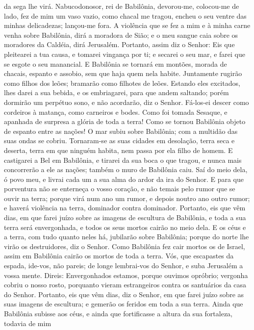 da sega lhe virá. Nabucodonosor, rei de Babilônia,
devorou-me, colocou-me de lado, fez de mim um vaso vazio, como
chacal me tragou, encheu o seu ventre das minhas delicadezas;
lançou-me fora. A violência que se fez a mim e à minha carne
venha sobre Babilônia, dirá a moradora de Sião; e o meu sangue caia
sobre os moradores da Caldéia, dirá Jerusalém. Portanto,
assim diz o Senhor: Eis que pleitearei a tua causa, e tomarei
vingança por ti; e secarei o seu mar, e farei que se esgote o seu
manancial. E Babilônia se tornará em montões, morada de
chacais, espanto e assobio, sem que haja quem nela habite.
Juntamente rugirão como filhos dos leões; bramarão como
filhotes de leões. Estando eles excitados, lhes darei a sua
bebida, e os embriagarei, para que andem saltando; porém dormirão um
perpétuo sono, e não acordarão, diz o Senhor. Fá-los-ei
descer como cordeiros à matança, como carneiros e bodes. Como
foi tomada Sesaque, e apanhada de surpresa a glória de toda a terra!
Como se tornou Babilônia objeto de espanto entre as nações! O
mar subiu sobre Babilônia; com a multidão das suas ondas se cobriu.
Tornaram-se as suas cidades em desolação, terra seca e
deserta, terra em que ninguém habita, nem passa por ela filho de
homem. E castigarei a Bel em Babilônia, e tirarei da sua boca
o que tragou, e nunca mais concorrerão a ele as nações; também o
muro de Babilônia caiu. Saí do meio dela, ó povo meu, e
livrai cada um a sua alma do ardor da ira do Senhor. E para
que porventura não se enterneça o vosso coração, e não temais pelo
rumor que se ouvir na terra; porque virá num ano um rumor, e depois
noutro ano outro rumor; e haverá violência na terra, dominador
contra dominador. Portanto, eis que vêm dias, em que farei
juízo sobre as imagens de escultura de Babilônia, e toda a sua terra
será envergonhada, e todos os seus mortos cairão no meio dela.
E os céus e a terra, com tudo quanto neles há, jubilarão
sobre Babilônia; porque do norte lhe virão os destruidores, diz o
Senhor. Como Babilônia fez cair mortos os de Israel, assim em
Babilônia cairão os mortos de toda a terra. Vós, que
escapastes da espada, ide-vos, não pareis; de longe lembrai-vos do
Senhor, e suba Jerusalém a vossa mente. Direis: Envergonhados
estamos, porque ouvimos opróbrio; vergonha cobriu o nosso rosto,
porquanto vieram estrangeiros contra os santuários da casa do
Senhor. Portanto, eis que vêm dias, diz o Senhor, em que
farei juízo sobre as suas imagens de escultura; e gemerão os feridos
em toda a sua terra. Ainda que Babilônia subisse aos céus, e
ainda que fortificasse a altura da sua fortaleza, todavia de mim
